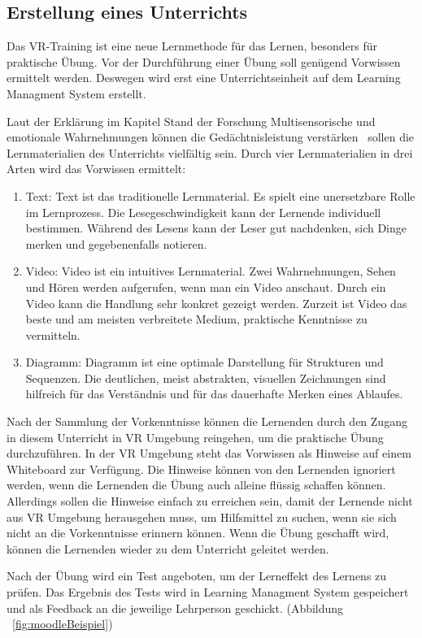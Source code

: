  \subsection{Erstellung eines Unterrichts}
 Das VR-Training ist eine neue Lernmethode für das Lernen, besonders für praktische Übung. Vor der Durchführung einer Übung soll genügend Vorwissen ermittelt werden. Deswegen wird erst eine Unterrichtseinheit auf dem Learning Managment System erstellt.

 Laut der Erklärung im Kapitel Stand der Forschung \glqq Multisensorische und emotionale Wahrnehmungen können die Gedächtnisleistung verstärken\grqq\ \citep{11} sollen die Lernmaterialien des Unterrichts vielfältig sein. Durch vier Lernmaterialien in drei Arten wird das Vorwissen ermittelt:
 \begin{enumerate}
    \item Text: Text ist das traditionelle Lernmaterial. Es spielt eine unersetzbare Rolle im Lernprozess. Die Lesegeschwindigkeit kann der Lernende individuell bestimmen. Während des Lesens kann der Leser gut nachdenken, sich Dinge merken und gegebenenfalls notieren.
    \item Video: Video ist ein intuitives Lernmaterial. Zwei Wahrnehmungen, Sehen und Hören werden aufgerufen, wenn man ein Video anschaut. Durch ein Video kann die Handlung sehr konkret gezeigt werden. Zurzeit ist Video das beste und am meisten verbreitete Medium, praktische Kenntnisse zu vermitteln.
    \item Diagramm: Diagramm ist eine optimale Darstellung für Strukturen und Sequenzen. Die deutlichen, meist abstrakten, visuellen Zeichnungen sind hilfreich für das Verständnis und für das dauerhafte Merken eines Ablaufes.
 \end{enumerate}

 Nach der Sammlung der Vorkenntnisse können die Lernenden durch den Zugang in diesem Unterricht in VR Umgebung reingehen, um die praktische Übung durchzuführen. In der VR Umgebung steht das Vorwissen als Hinweise auf einem Whiteboard zur Verfügung. Die Hinweise können von den Lernenden ignoriert werden, wenn die Lernenden die Übung auch alleine flüssig schaffen können. Allerdings sollen die Hinweise einfach zu erreichen sein, damit der Lernende nicht aus VR Umgebung herausgehen muss, um Hilfsmittel zu suchen, wenn sie sich nicht an die Vorkenntnisse erinnern können. Wenn die Übung geschafft wird, können die Lernenden wieder zu dem Unterricht geleitet werden.

 Nach der Übung wird ein Test angeboten, um der Lerneffekt des Lernens zu prüfen. Das Ergebnis des Tests wird in Learning Managment System gespeichert und als Feedback an die jeweilige Lehrperson geschickt. (Abbildung ~\ref{fig:moodleBeispiel})
 
